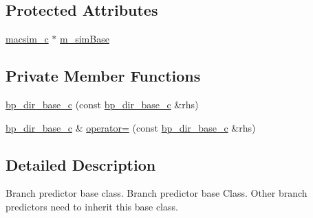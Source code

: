 \subsection*{Protected Attributes}
\begin{DoxyCompactItemize}
\item 
\hyperlink{classmacsim__c}{macsim\_\-c} $\ast$ \hyperlink{classbp__dir__base__c_a8d9e0f72bab48735f49fab60bd2fe0df}{m\_\-simBase}
\end{DoxyCompactItemize}
\subsection*{Private Member Functions}
\begin{DoxyCompactItemize}
\item 
\hyperlink{classbp__dir__base__c_a3d9afa9a22044fc361455c7335dd0979}{bp\_\-dir\_\-base\_\-c} (const \hyperlink{classbp__dir__base__c}{bp\_\-dir\_\-base\_\-c} \&rhs)
\item 
\hyperlink{classbp__dir__base__c}{bp\_\-dir\_\-base\_\-c} \& \hyperlink{classbp__dir__base__c_a9030ec391bf019913c0111651e38591b}{operator=} (const \hyperlink{classbp__dir__base__c}{bp\_\-dir\_\-base\_\-c} \&rhs)
\end{DoxyCompactItemize}


\subsection{Detailed Description}
Branch predictor base class. Branch predictor base Class. Other branch predictors need to inherit this base class. 

